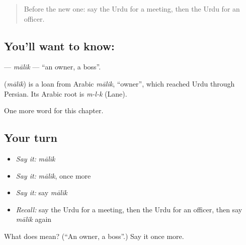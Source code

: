 \label{lesson:UR-C261-malik}



\begin{quote}
Before the new one: say the Urdu for a meeting, then the Urdu for an officer.
\end{quote}

\subsection*{You'll want to know: }
\textbf{} — \emph{mālik} — \textquotedblleft{}an owner, a boss\textquotedblright{}.

\begin{cousinweb}
\textbf{} (\emph{mālik}) is a loan from Arabic \emph{mālik}, \textquotedblleft{}owner\textquotedblright{}, which reached Urdu through Persian. Its Arabic root is \emph{m-l-k} (Lane).
\end{cousinweb}

\begin{grammarlens}[title={What you've built}]
One more word for this chapter.
\end{grammarlens}

\subsection*{Your turn}
\begin{itemize}
\raggedright
  \item \emph{Say it:} \emph{mālik}
  \item \emph{Say it:} \emph{mālik}, once more
  \item \emph{Say it:} say \emph{mālik}
  \item \emph{Recall:} say the Urdu for a meeting, then the Urdu for an officer, then say \emph{mālik} again
\end{itemize}

\begin{tcolorbox}[breakable,colback=teal!4,colframe=teal!35!black,title={Before you move on}]
What does  mean? (\textquotedblleft{}An owner, a boss\textquotedblright{}.) Say it once more.
\end{tcolorbox}
